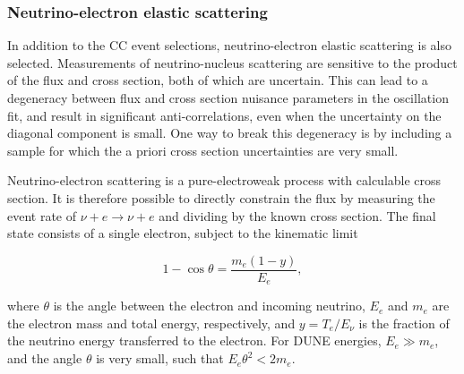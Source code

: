 \subsubsection{Neutrino-electron elastic scattering}



In addition to the CC event selections, neutrino-electron elastic scattering is also selected. Measurements of neutrino-nucleus scattering are sensitive to the product of the flux and cross section, both of which are uncertain. This can lead to a degeneracy between flux and cross section nuisance parameters in the oscillation fit, and result in significant anti-correlations, even when the uncertainty on the diagonal component is small. One way to break this degeneracy is by including a sample for which the a priori cross section uncertainties are very small. 

Neutrino-electron scattering is a pure-electroweak process with calculable cross section. It is therefore possible to directly constrain the flux by measuring the event rate of $\nu+ e \rightarrow \nu +e$ and dividing by the known cross section. The final state consists of a single electron, subject to the kinematic limit 

\begin{equation}
1 - \cos \theta = \frac{m_{e}(1-y)}{E_{e}},
\end{equation}

where $\theta$ is the angle between the electron and incoming neutrino, $E_{e}$ and $m_{e}$ are the electron mass and total energy, respectively, and $y = T_{e}/E_{\nu}$ is the fraction of the neutrino energy transferred to the electron. For DUNE energies, $E_{e} \gg m_{e}$, and the angle $\theta$ is very small, such that $E_{e}\theta^{2} < 2m_{e}$.

